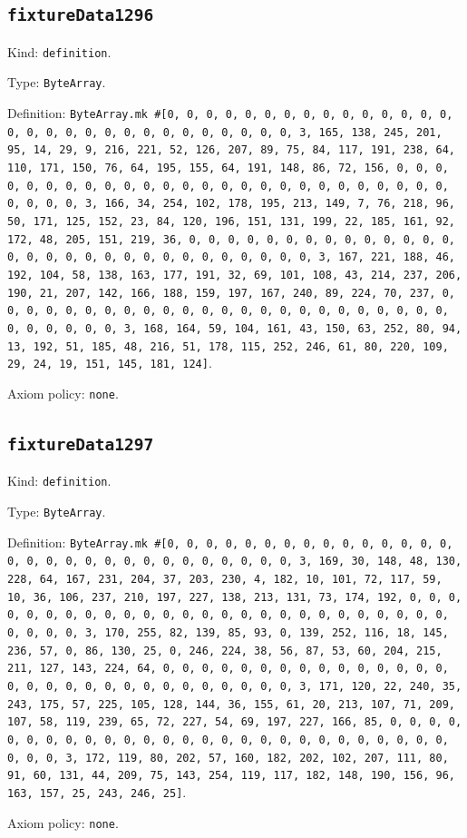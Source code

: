 \documentclass[11pt]{article}
\begin{document}
\subsection*{\texttt{fixtureData1296}}
\noindent Kind: \texttt{definition}.\par
\noindent Type: \texttt{ByteArray}.\par
\noindent Definition: \texttt{ByteArray.mk \#[0, 0, 0, 0, 0, 0, 0, 0, 0, 0, 0, 0, 0, 0, 0, 0, 0, 0, 0, 0, 0, 0, 0, 0, 0, 0, 0, 0, 0, 0, 3, 165, 138, 245, 201, 95, 14, 29, 9, 216, 221, 52, 126, 207, 89, 75, 84, 117, 191, 238, 64, 110, 171, 150, 76, 64, 195, 155, 64, 191, 148, 86, 72, 156, 0, 0, 0, 0, 0, 0, 0, 0, 0, 0, 0, 0, 0, 0, 0, 0, 0, 0, 0, 0, 0, 0, 0, 0, 0, 0, 0, 0, 0, 0, 3, 166, 34, 254, 102, 178, 195, 213, 149, 7, 76, 218, 96, 50, 171, 125, 152, 23, 84, 120, 196, 151, 131, 199, 22, 185, 161, 92, 172, 48, 205, 151, 219, 36, 0, 0, 0, 0, 0, 0, 0, 0, 0, 0, 0, 0, 0, 0, 0, 0, 0, 0, 0, 0, 0, 0, 0, 0, 0, 0, 0, 0, 0, 0, 3, 167, 221, 188, 46, 192, 104, 58, 138, 163, 177, 191, 32, 69, 101, 108, 43, 214, 237, 206, 190, 21, 207, 142, 166, 188, 159, 197, 167, 240, 89, 224, 70, 237, 0, 0, 0, 0, 0, 0, 0, 0, 0, 0, 0, 0, 0, 0, 0, 0, 0, 0, 0, 0, 0, 0, 0, 0, 0, 0, 0, 0, 0, 0, 3, 168, 164, 59, 104, 161, 43, 150, 63, 252, 80, 94, 13, 192, 51, 185, 48, 216, 51, 178, 115, 252, 246, 61, 80, 220, 109, 29, 24, 19, 151, 145, 181, 124]}.\par
\noindent Axiom policy: \texttt{none}.\par
\subsection*{\texttt{fixtureData1297}}
\noindent Kind: \texttt{definition}.\par
\noindent Type: \texttt{ByteArray}.\par
\noindent Definition: \texttt{ByteArray.mk \#[0, 0, 0, 0, 0, 0, 0, 0, 0, 0, 0, 0, 0, 0, 0, 0, 0, 0, 0, 0, 0, 0, 0, 0, 0, 0, 0, 0, 0, 0, 3, 169, 30, 148, 48, 130, 228, 64, 167, 231, 204, 37, 203, 230, 4, 182, 10, 101, 72, 117, 59, 10, 36, 106, 237, 210, 197, 227, 138, 213, 131, 73, 174, 192, 0, 0, 0, 0, 0, 0, 0, 0, 0, 0, 0, 0, 0, 0, 0, 0, 0, 0, 0, 0, 0, 0, 0, 0, 0, 0, 0, 0, 0, 0, 3, 170, 255, 82, 139, 85, 93, 0, 139, 252, 116, 18, 145, 236, 57, 0, 86, 130, 25, 0, 246, 224, 38, 56, 87, 53, 60, 204, 215, 211, 127, 143, 224, 64, 0, 0, 0, 0, 0, 0, 0, 0, 0, 0, 0, 0, 0, 0, 0, 0, 0, 0, 0, 0, 0, 0, 0, 0, 0, 0, 0, 0, 0, 0, 3, 171, 120, 22, 240, 35, 243, 175, 57, 225, 105, 128, 144, 36, 155, 61, 20, 213, 107, 71, 209, 107, 58, 119, 239, 65, 72, 227, 54, 69, 197, 227, 166, 85, 0, 0, 0, 0, 0, 0, 0, 0, 0, 0, 0, 0, 0, 0, 0, 0, 0, 0, 0, 0, 0, 0, 0, 0, 0, 0, 0, 0, 0, 0, 3, 172, 119, 80, 202, 57, 160, 182, 202, 102, 207, 111, 80, 91, 60, 131, 44, 209, 75, 143, 254, 119, 117, 182, 148, 190, 156, 96, 163, 157, 25, 243, 246, 25]}.\par
\noindent Axiom policy: \texttt{none}.\par
\end{document}
